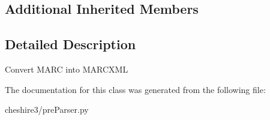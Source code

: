 \subsection*{Additional Inherited Members}


\subsection{Detailed Description}
\begin{DoxyVerb}Convert MARC into MARCXML \end{DoxyVerb}
 

The documentation for this class was generated from the following file\-:\begin{DoxyCompactItemize}
\item 
cheshire3/pre\-Parser.\-py\end{DoxyCompactItemize}
